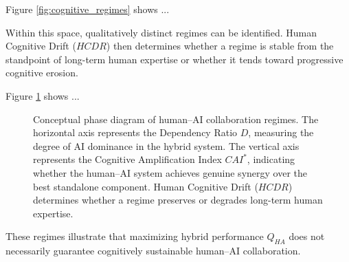 \documentclass[11pt]{article}
\begin{document}
Figure \ref{fig:cognitive_regimes} shows ...

Within this space, qualitatively distinct regimes can be identified.
Human Cognitive Drift ($HCDR$) then determines whether a regime is stable
from the standpoint of long-term human expertise or whether it tends
toward progressive cognitive erosion.

Figure \ref{fig:phase_diagram} shows ...
\begin{figure}[h!]
\centering
{}
\caption{Conceptual phase diagram of human--AI collaboration regimes.
The horizontal axis represents the Dependency Ratio $D$, measuring the
degree of AI dominance in the hybrid system. The vertical axis represents
the Cognitive Amplification Index $CAI^*$, indicating whether the
human--AI system achieves genuine synergy over the best standalone
component. Human Cognitive Drift ($HCDR$) determines whether a regime
preserves or degrades long-term human expertise.}
\label{fig:phase_diagram}
\end{figure}
These regimes illustrate that maximizing hybrid performance $Q_{HA}$
does not necessarily guarantee cognitively sustainable human--AI
collaboration.
\end{document}
